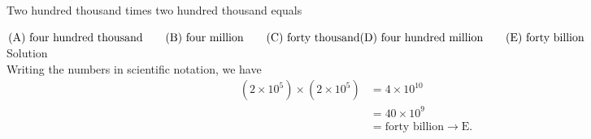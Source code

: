 

Two hundred thousand times two hundred thousand equals

$\text{(A)}\ \text{four hundred thousand} \qquad  \text{(B)}\ \text{four million} \qquad  \text{(C)}\ \text{forty thousand} \qquad \\ \text{(D)}\ \text{four hundred million} \qquad  \text{(E)}\ \text{forty billion}$
\\
Solution
\\
Writing the numbers in scientific notation, we have \begin{align*} (2\times 10^5)\times (2\times 10^5) &= 4\times 10^{10} \\ &= 40\times 10^9 \\ &= \text{forty billion} \rightarrow \boxed{\text{E}}. \end{align*}
